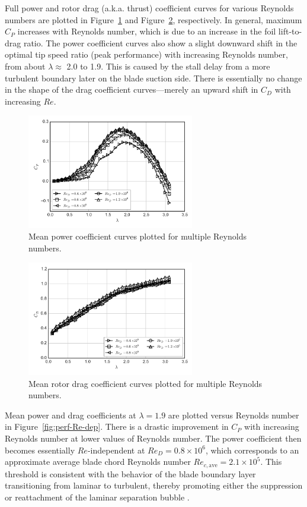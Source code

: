 \documentclass[energies,article,accept,moreauthors,pdftex,12pt,a4paper]{mdpi}
\begin{document}
Full power and rotor drag (a.k.a. thrust) coefficient curves for various
Reynolds numbers are plotted in Figure~\ref{fig:cp-curves} and
Figure~\ref{fig:cd-curves}, respectively. In general, maximum $C_P$ increases
with Reynolds number, which is due to an increase in the foil lift-to-drag
ratio. The power coefficient curves also show a slight downward shift in the
optimal tip speed ratio (peak performance) with increasing Reynolds number, from
about $\lambda \approx$ 2.0 to 1.9. This is caused by the stall delay from a
more turbulent boundary later on the blade suction side. There is essentially no
change in the shape of the drag coefficient curves---merely an upward shift in
$C_D$ with increasing $Re$.

\begin{figure}[ht]
\centering
\includegraphics[width=0.65\textwidth]{figures/cp_curves}
\caption{Mean power coefficient curves plotted for
multiple Reynolds numbers.}
\label{fig:cp-curves}
\end{figure}

\begin{figure}[ht]
\centering
\includegraphics[width=0.65\textwidth]{figures/cd_curves}
\caption{Mean rotor drag coefficient curves plotted for
multiple Reynolds numbers.}
\label{fig:cd-curves}
\end{figure}

Mean power and drag coefficients at $\lambda=1.9$ are plotted versus Reynolds
number in Figure~\ref{fig:perf-Re-dep}. There is a drastic improvement in $C_P$
with increasing Reynolds number at lower values of Reynolds number. The power
coefficient then becomes  essentially $Re$-independent at $Re_D = 0.8 \times
10^6$, which corresponds to an approximate average blade chord Reynolds number
$Re_{c, \mathrm{ave}} = 2.1 \times 10^5$. This threshold is consistent with the
behavior of the blade boundary layer transitioning from laminar to turbulent,
thereby promoting either the suppression or reattachment of the laminar
separation bubble \cite{Lissaman1983}.
\end{document}
